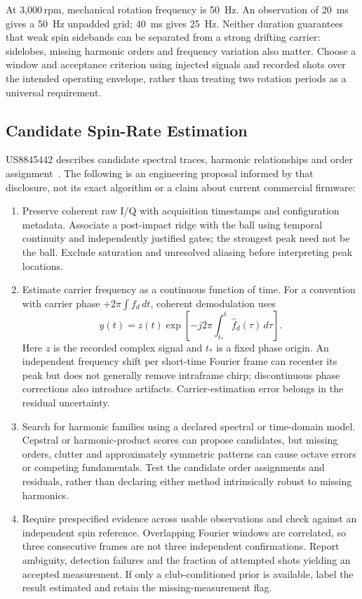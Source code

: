 At 3,000\,rpm, mechanical rotation frequency is \SI{50}{\hertz}.
An observation of \SI{20}{\milli\second} gives a \SI{50}{\hertz} unpadded grid; \SI{40}{\milli\second} gives \SI{25}{\hertz}.
Neither duration guarantees that weak spin sidebands can be separated from a strong drifting carrier: sidelobes, missing harmonic orders and frequency variation also matter.
Choose a window and acceptance criterion using injected signals and recorded shots over the intended operating envelope, rather than treating two rotation periods as a universal requirement.

\subsection{Candidate Spin-Rate Estimation}

US8845442 describes candidate spectral traces, harmonic relationships and order assignment~\cite{us8845442}.
The following is an engineering proposal informed by that disclosure, not its exact algorithm or a claim about current commercial firmware:
\begin{enumerate}\itemsep2pt
\item Preserve coherent raw I/Q with acquisition timestamps and configuration metadata.
Associate a post-impact ridge with the ball using temporal continuity and independently justified gates; the strongest peak need not be the ball.
Exclude saturation and unresolved aliasing before interpreting peak locations.
\item Estimate carrier frequency as a continuous function of time.
For a convention with carrier phase $+2\pi\int f_d\,dt$, coherent demodulation uses
\begin{equation}
\label{eq:impldechirp}
y(t)=z(t)\exp\!\left[-j2\pi\int_{t_*}^{t}\widehat f_d(\tau)\,d\tau\right].
\end{equation}
Here $z$ is the recorded complex signal and $t_*$ is a fixed phase origin.
An independent frequency shift per short-time Fourier frame can recenter its peak but does not generally remove intraframe chirp; discontinuous phase corrections also introduce artifacts.
Carrier-estimation error belongs in the residual uncertainty.
\item Search for harmonic families using a declared spectral or time-domain model.
Cepstral or harmonic-product scores can propose candidates, but missing orders, clutter and approximately symmetric patterns can cause octave errors or competing fundamentals.
Test the candidate order assignments and residuals, rather than declaring either method intrinsically robust to missing harmonics.
\item Require prespecified evidence across usable observations and check against an independent spin reference.
Overlapping Fourier windows are correlated, so three consecutive frames are not three independent confirmations.
Report ambiguity, detection failures and the fraction of attempted shots yielding an accepted measurement.
If only a club-conditioned prior is available, label the result estimated and retain the missing-measurement flag.
\end{enumerate}

